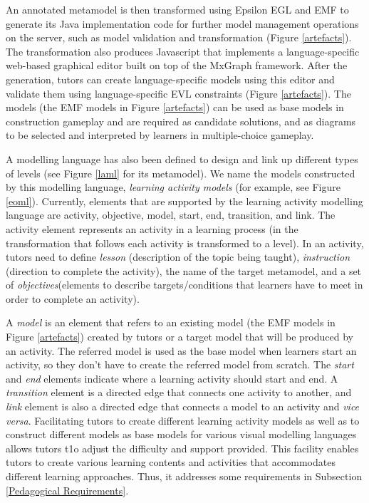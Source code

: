 \documentclass[12pt, a4paper]{report} \usepackage[titletoc]{appendix}
\begin{document}
An annotated metamodel is then transformed using Epsilon EGL \cite{kolovos2010epsilon} and EMF \cite{steinberg2008emf} to generate its Java implementation code for further model management operations on the server, such as model validation and transformation (Figure \ref{artefacts}). The transformation also produces Javascript that implements a language-specific web-based graphical editor built on top of the MxGraph framework. After the generation, tutors can create language-specific models using this editor and validate them using language-specific EVL \cite{kolovos2006eclipse} constraints (Figure \ref{artefacts}). The models (the EMF models in Figure \ref{artefacts}) can be used as base models in construction gameplay and are required as candidate solutions, and as diagrams to be selected and interpreted by learners in multiple-choice gameplay.  

A modelling language has also been defined to design and link up different types of levels (see Figure \ref{laml} for its metamodel). We name the models constructed by this modelling language, \emph{learning activity models} (for example, see Figure \ref{eoml}). Currently, elements that are supported by the learning activity modelling language are activity, objective, model, start, end, transition, and link. The activity element represents an activity in a learning process (in the transformation that follows each activity is transformed to a level). In an activity, tutors need to define \emph{lesson} (description of the topic being taught), \emph{instruction} (direction to complete the activity), the name of the target metamodel, and a set of \emph{objectives}(elements to describe targets/conditions that learners have to meet in order to complete an activity). 

A \emph{model} is an element that refers to an existing model (the EMF models in Figure \ref{artefacts}) created by tutors or a target model that will be produced by an activity. The referred model is used as the base model when learners start an activity, so they don't have to create the referred model from scratch. The \emph{start} and \emph{end} elements indicate where a learning activity should start and end. A \emph{transition} element is a directed edge that connects one activity to another, and \emph{link} element is also a directed edge that connects a model to an activity and \textit{vice versa}. Facilitating tutors to create different learning activity models as well as to construct different models as base models for various visual modelling languages allows tutors t1o adjust the difficulty and support provided. This facility enables tutors to create various learning contents and activities that accommodates different learning approaches. Thus, it addresses some requirements in Subsection \ref{Pedagogical Requirements}.
\end{document}
